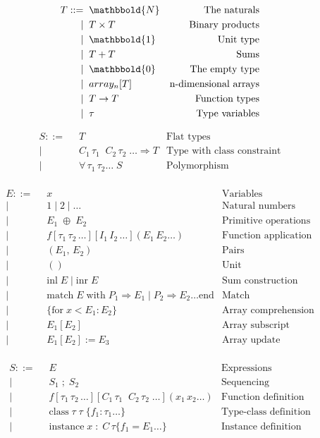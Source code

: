 \documentclass[10pt,letter]{article}
\newcommand{\nats}[0]{\mathbbold{N}}
\newcommand{\plus}[0]{+}
\newcommand{\funcArrow}[0]{\to}
\newcommand{\matchArrow}[0]{\Rightarrow}
\newcommand{\constraintArrow}[0]{\Rightarrow}
\newcommand{\unitType}[0]{\mathbbold{1}}
\newcommand{\nullType}[0]{\mathbbold{0}}
\newcommand{\firstAlt}[2]{\;\;&#1 & \text{#2}\\}
\newcommand{\alt}[2]{| \firstAlt{#1}{#2}}
\begin{document}
\begin{align*}
  T ::= \firstAlt{\nats}{The naturals}
        \alt{T \times T}{Binary products}
        \alt{\unitType}{Unit type}
        \alt{T \plus T}{Sums}
        \alt{\nullType}{The empty type}
        \alt{array_n[T]}{n-dimensional arrays}
        \alt{T \funcArrow T}{Function types}
        \alt{\tau}{Type variables}
\end{align*}

\begin{align*}
  S ::= \firstAlt{T}{Flat types}
        \alt{C_1 \, \tau_1 \;\; C_2 \, \tau_2\; \dots \constraintArrow T}
            {Type with class constraint}
        \alt{\forall \,\tau_1\, \tau_2 \dots\; S}{Polymorphism}
\end{align*}

\begin{align*}
  E ::= \firstAlt{x}{Variables}
        \alt{1 \;|\; 2 \;|\; \dots}{Natural numbers}
        \alt{E_1 \; \oplus \; E_2}{Primitive operations}
        \alt{f [\tau_1\,\tau_2\,\dots] [I_1\,I_2\,\dots] (E_1\,E_2 \dots)}
            {Function application}
        \alt{(E_1,\, E_2)}{Pairs}
        \alt{()}{Unit}
        \alt{\mathrm{inl}\; E \;|\; \mathrm{inr}\; E}{Sum construction}
        \alt{\mathrm{match}\; E \;\mathrm{with}\;
               P_1 \matchArrow E_1 \;|\;
               P_2 \matchArrow E_2 \dots
               \mathrm{end}}{Match}
        \alt{\{ \mathrm{for}\; x < E_1 : E_2 \} }{Array comprehension}
        \alt{E_1[E_2]}{Array subscript}
        \alt{E_1[E_2] := E_3}{Array update}
\end{align*}

\begin{align*}
  S ::= \firstAlt{E}{Expressions}
        \alt{S_1 \;;\; S_2}{Sequencing}
        \alt{f [\tau_1\,\tau_2\,\dots] [C_1\,\tau_1\;\;C_2\,\tau_2\;\dots] (x_1\,x_2 \dots)}
            {Function definition}
        \alt{\mathrm{class}\; \tau\; \tau \; \{ f_1 : \tau_1 \dots \} }
            {Type-class definition}
        \alt{\mathrm{instance}\; x \;:\; C \, \tau \{ f_1 = E_1 \dots \}}
            {Instance definition}
\end{align*}
\end{document}
